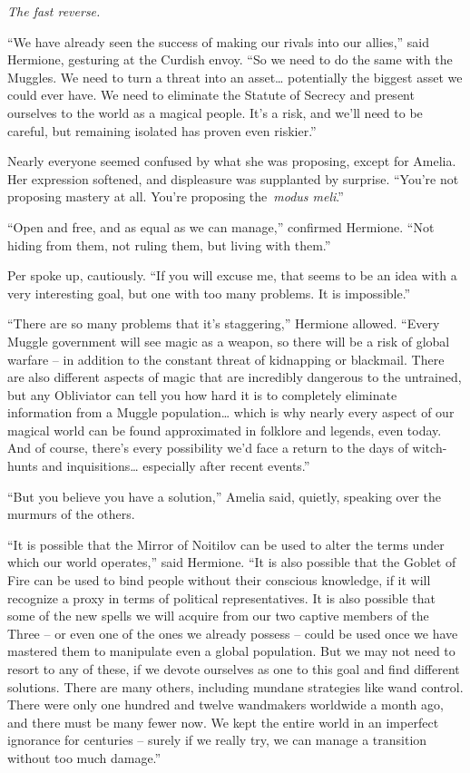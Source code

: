 \emph{The fast reverse.}

``We have already seen the success of making our rivals into our
allies,'' said Hermione, gesturing at the Curdish envoy. ``So we need to
do the same with the Muggles. We need to turn a threat into an
asset\ldots{} potentially the biggest asset we could ever have. We need
to eliminate the Statute of Secrecy and present ourselves to the world
as a magical people. It's a risk, and we'll need to be careful, but
remaining isolated has proven even riskier.''

Nearly everyone seemed confused by what she was proposing, except for
Amelia. Her expression softened, and displeasure was supplanted by
surprise. ``You're not proposing mastery at all. You're proposing
the~\emph{modus meli}.''

``Open and free, and as equal as we can manage,'' confirmed Hermione.
``Not hiding from them, not ruling them, but living with them.''

Per spoke up, cautiously. ``If you will excuse me, that seems to be an
idea with a very interesting goal, but one with too many problems. It is
impossible.''

``There are so many problems that it's staggering,'' Hermione allowed.
``Every Muggle government will see magic as a weapon, so there will be a
risk of global warfare -- in addition to the constant threat of
kidnapping or blackmail. There are also different aspects of magic that
are incredibly dangerous to the untrained, but any Obliviator can tell
you how hard it is to completely eliminate information from a Muggle
population\ldots{} which is why nearly every aspect of our magical world
can be found approximated in folklore and legends, even today. And of
course, there's every possibility we'd face a return to the days of
witch-hunts and inquisitions\ldots{} especially after recent events.''

``But you believe you have a solution,'' Amelia said, quietly, speaking
over the murmurs of the others.

``It is possible that the Mirror of Noitilov can be used to alter the
terms under which our world operates,'' said Hermione. ``It is also
possible that the Goblet of Fire can be used to bind people without
their conscious knowledge, if it will recognize a proxy in terms of
political representatives. It is also possible that some of the new
spells we will acquire from our two captive members of the Three -- or
even one of the ones we already possess -- could be used once we have
mastered them to manipulate even a global population. But we may not
need to resort to any of these, if we devote ourselves as one to this
goal and find different solutions. There are many others, including
mundane strategies like wand control. There were only one hundred and
twelve wandmakers worldwide a month ago, and there must be many fewer
now. We kept the entire world in an imperfect ignorance for centuries --
surely if we really try, we can manage a transition without too much
damage.''

